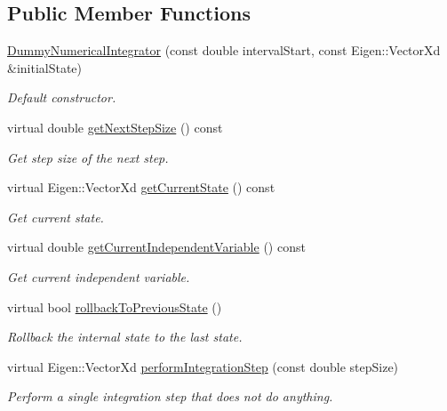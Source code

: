 \subsection*{Public Member Functions}
\begin{DoxyCompactItemize}
\item 
\hyperlink{classtudat_1_1unit__tests_1_1DummyNumericalIntegrator_acd6cd9cc4c5f567280ca6f6537e553dc}{Dummy\+Numerical\+Integrator} (const double interval\+Start, const Eigen\+::\+Vector\+Xd \&initial\+State)
\begin{DoxyCompactList}\small\item\em Default constructor. \end{DoxyCompactList}\item 
virtual double \hyperlink{classtudat_1_1unit__tests_1_1DummyNumericalIntegrator_a7e9a7cffb3ebf2cdf6057789de347f73}{get\+Next\+Step\+Size} () const 
\begin{DoxyCompactList}\small\item\em Get step size of the next step. \end{DoxyCompactList}\item 
virtual Eigen\+::\+Vector\+Xd \hyperlink{classtudat_1_1unit__tests_1_1DummyNumericalIntegrator_a114c322002865993772fb8af89b26b4f}{get\+Current\+State} () const 
\begin{DoxyCompactList}\small\item\em Get current state. \end{DoxyCompactList}\item 
virtual double \hyperlink{classtudat_1_1unit__tests_1_1DummyNumericalIntegrator_ac45e222c81d40070eaccc74cbf5dd2ca}{get\+Current\+Independent\+Variable} () const 
\begin{DoxyCompactList}\small\item\em Get current independent variable. \end{DoxyCompactList}\item 
virtual bool \hyperlink{classtudat_1_1unit__tests_1_1DummyNumericalIntegrator_a2fde96c0af702c49c80df90ce4540fbc}{rollback\+To\+Previous\+State} ()
\begin{DoxyCompactList}\small\item\em Rollback the internal state to the last state. \end{DoxyCompactList}\item 
virtual Eigen\+::\+Vector\+Xd \hyperlink{classtudat_1_1unit__tests_1_1DummyNumericalIntegrator_aa000aed365de1583a25fd8be85497081}{perform\+Integration\+Step} (const double step\+Size)
\begin{DoxyCompactList}\small\item\em Perform a single integration step that does not do anything. \end{DoxyCompactList}\end{DoxyCompactItemize}
